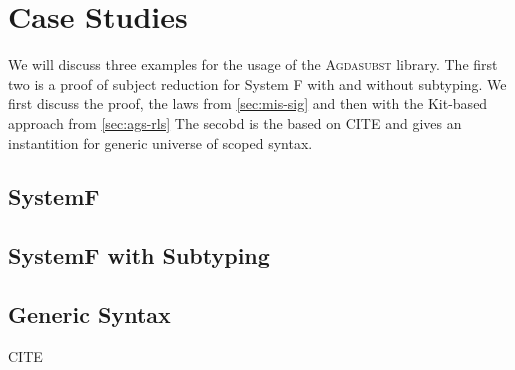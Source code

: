 \documentclass[screen,nonacm]{acmart}
\begin{document}
\section{Case Studies}\label{sec:ext}
We will discuss three examples for the usage of the \textsc{Agdasubst} library.
The first two is a proof of subject reduction for System F with and without
subtyping. We first discuss the proof, the laws from \cref{sec:mis-sig} and
then with the Kit-based approach from \cref{sec:ags-rls} The secobd is the
based on CITE and gives an instantition for generic universe of scoped syntax.
\subsection{SystemF}\label{sec:ext-syf}

\subsection{SystemF with Subtyping}\label{sec:ext-sfs}

\subsection{Generic Syntax}\label{sec:ext-uni}
CITE

% 
\end{document}
